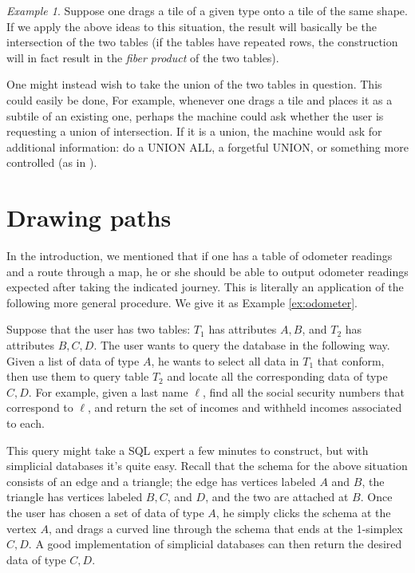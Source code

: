 \documentclass{amsart}
\theoremstyle{remark}
\newtheorem{example}[theorem]{Example}
\theoremstyle{definition}
\begin{document}
\begin{example}

Suppose one drags a tile of a given type onto a tile of the same shape.  If we apply the above ideas to this situation, the result will basically be the intersection of the two tables (if the tables have repeated rows, the construction will in fact result in the {\em fiber product} of the two tables).  

One might instead wish to take the union of the two tables in question.  This could easily be done, For example, whenever one drags a tile and places it as a subtile of an existing one, perhaps the machine could ask whether the user is requesting a union of intersection.  If it is a union, the machine would ask for additional information: do a UNION ALL, a forgetful UNION, or something more controlled (as in \cite{Spi}).

\end{example}

\section{Drawing paths}\label{sec:curves}

In the introduction, we mentioned that if one has a table of odometer readings and a route through a map, he or she should be able to output odometer readings expected after taking the indicated journey.  This is literally an application of the following more general procedure.  We give it as Example \ref{ex:odometer}.

Suppose that the user has two tables: $T_1$ has attributes $A,B$, and $T_2$ has attributes $B,C,D$.  The user wants to query the database in the following way.  Given a list of data of type $A$, he wants to select all data in $T_1$ that conform, then use them to query table $T_2$ and locate all the corresponding data of type $C,D$.  For example, given a last name $\ell$, find all the social security numbers that correspond to $\ell$, and return the set of incomes and withheld incomes associated to each.

This query might take a SQL expert a few minutes to construct, but with simplicial databases it's quite easy.  Recall that the schema for the above situation consists of an edge and a triangle; the edge has vertices labeled $A$ and $B$, the triangle has vertices labeled $B,C$, and $D$, and the two are attached at $B$. Once the user has chosen a set of data of type $A$, he simply clicks the schema at the vertex $A$, and drags a curved line through the schema that ends at the 1-simplex $C,D$.  A good implementation of simplicial databases can then return the desired data of type $C,D$. 
\end{document}
